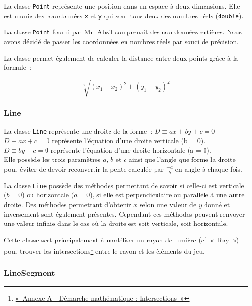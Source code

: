 \documentclass[]{report}
\begin{document}
La classe \texttt{Point} représente une position dans un espace à deux dimensions. 
Elle est munie des coordonnées \texttt{x} et \texttt{y} qui sont tous deux des
nombres réels (\texttt{double}). 

La classe \texttt{Point} fourni par Mr. Absil comprenait des coordonnées entières.
Nous avons décidé de passer les coordonnées en nombres réels par souci de précision.

La classe permet également de calculer la distance entre deux points grâce à la formule~:

$$ \sqrt[2]{(x_1 - x_2)^2 + (y_1 - y_2)^2} $$

\subsubsection{\label{Line}Line}

La classe \texttt{Line} représente une droite de la forme~: 
$ D \equiv ax + by + c = 0 $ \\

$ D \equiv ax + c = 0 $ représente l'équation d'une droite verticale (b = 0). \\
$ D \equiv by + c = 0 $ représente l'équation d'une droite horizontale (a = 0). \\

Elle possède les trois paramètres $ a $, $ b $ et $ c $ ainsi que l'angle
que forme la droite pour éviter de devoir reconvertir la pente calculée par $ \frac{-a}{b} $
en angle à chaque fois.

La classe \texttt{Line} possède des méthodes permettant de savoir si celle-ci est 
verticale ($ b = 0 $) ou horizontale ($ a = 0 $), si elle est perpendiculaire ou parallèle à une autre droite.
Des méthodes permettant d'obtenir $ x $ selon une valeur de $ y $ donné et
inversement sont également
présentes. Cependant ces méthodes peuvent renvoyer une valeur infinie dans le cas où la droite 
est soit verticale, soit horizontale.

Cette classe sert principalement à modéliser un rayon de lumière (cf. \hyperref[Ray]{«~Ray~»}) pour trouver 
les intersections\footnote{\hyperref[AnnexeIntersects]{«~Annexe A - Démarche mathématique : Intersections~»}} entre le rayon et les éléments du jeu.

\subsubsection{\label{LineSegment}LineSegment}
\end{document}
